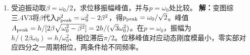\documentclass[UTF8,fontset=fandol,a4paper,11pt]{ctexart}
\begin{document}
\begin{enumerate}
\item 受迫振动取$\beta=\omega_0/2$，求位移振幅峰值，并与$p=\omega_0$处比较。
\textbf{解：}变图综三.4V3将$\beta$代入$p_{\rm peak}^2=\omega_0^2-2\beta^2$，得$p_{\rm peak}=\omega_0/\sqrt2$。峰值$A_{\rm peak}=h/[2\beta\sqrt{\omega_0^2-\beta^2}]=2h/(\sqrt3\omega_0^2)$。在$p=\omega_0$，振幅为$h/(2\beta\omega_0)=h/\omega_0^2$、相位滞后$\pi/2$。位移峰值对应动态刚度模最小，零实部对应四分之一周期相位，两条件给不同频率。
\begin{center}\begin{minipage}{.98\linewidth}\centering
{}
\end{minipage}
\end{center}
\end{enumerate}
\end{document}
